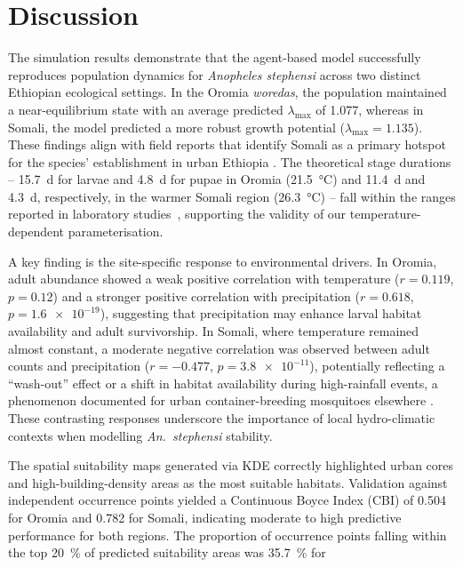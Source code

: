 \documentclass{article}
\begin{document}
\section{Discussion}
\label{sec:discussion}
\par
The simulation results demonstrate that the agent-based model successfully reproduces population dynamics for 
\textit{Anopheles stephensi} across two distinct Ethiopian ecological settings. In the Oromia \textit{woredas}, 
the population maintained a near-equilibrium state with an average predicted $\lambda_{\max}$ of \num{1.077}, 
whereas in Somali, the model predicted a more robust growth potential ($\lambda_{\max} = 1.135$). These findings 
align with field reports that identify Somali as a primary hotspot for the species' establishment in urban 
Ethiopia \citep{2021.MB.AUO}. The theoretical stage durations -- \qty{15.7}{\day} for larvae and \qty{4.8}{\day} 
for pupae in Oromia (\qty{21.5}{\celsius}) and \qty{11.4}{\day} and \qty{4.3}{\day}, respectively, in the warmer Somali 
region (\qty{26.3}{\celsius}) -- fall within the ranges reported in laboratory studies~\citep{2023.JJ.BBA}, supporting 
the validity of our temperature-dependent parameterisation.
\par
A key finding is the site-specific response to environmental drivers. In Oromia, adult abundance showed a weak positive 
correlation with temperature ($r = 0.119$, $p = 0.12$) and a stronger positive correlation with precipitation 
($r = 0.618$, $p = \num{1.6e-19}$), suggesting that precipitation may enhance larval habitat availability and adult 
survivorship. In Somali, where temperature remained almost constant, a moderate negative correlation was observed between 
adult counts and precipitation ($r = -0.477$, $p = \num{3.8e-11}$), potentially reflecting a ``wash-out'' effect or a shift 
in habitat availability during high-rainfall events, a phenomenon documented for urban container-breeding mosquitoes 
elsewhere \citep{2016.ST.OTI}. These contrasting responses underscore the importance of local hydro-climatic contexts 
when modelling \textit{An.~stephensi} stability.
\par
The spatial suitability maps generated via KDE correctly highlighted urban cores and high-building-density areas as the most 
suitable habitats. Validation against independent occurrence points yielded a Continuous Boyce Index (CBI) of \num{0.504} 
for Oromia and \num{0.782} for Somali, indicating moderate to high predictive performance for both regions. The proportion 
of occurrence points falling within the top \qty{20}{\percent} of predicted suitability areas was \qty{35.7}{\percent} for 
\end{document}
